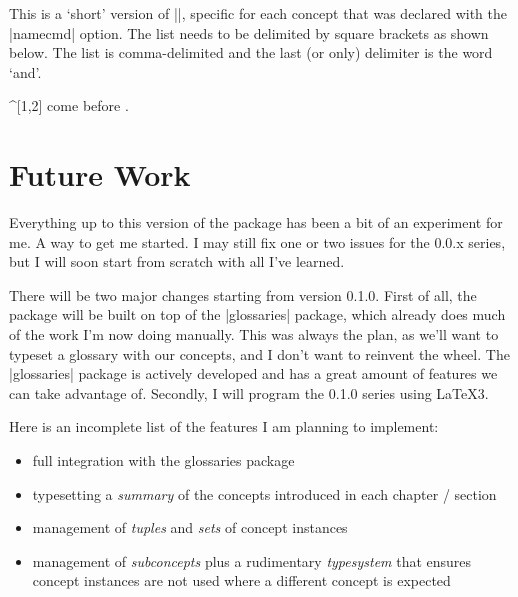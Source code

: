 \documentclass[a4paper]{packagedoc}
\begin{document}
This is a `short' version of |\ConceptNameAndSymbols|,
specific for each concept that was declared with the |namecmd| option.
The  list needs to be delimited by square brackets
as shown below. The list is comma-delimited and the last (or only) delimiter is
the word `and'.

\begin{latex-example-show}
\delta^[1,2] come before \delta[3]. 
\end{latex-example-show}

\section{Future Work}                                                          %

Everything up to this version of the package has been a bit of an experiment
for me. A way to get me started. I may still fix one or two issues for the
0.0.x series, but I will soon start from scratch with all I've learned.

There will be two major changes starting from version 0.1.0. First of all, the
package will be built on top of the |glossaries| package, which already does
much of the work I'm now doing manually. This was always the plan, as we'll
want to typeset a glossary with our concepts, and I don't want to reinvent
the wheel. The |glossaries| package is actively developed and has a great
amount of features we can take advantage of. Secondly, I will program the
0.1.0 series using \LaTeX3.

Here is an incomplete list of the features I am planning to implement:
\begin{itemize}
  \item full integration with the \textsf{glossaries} package
  \item typesetting a \emph{summary} of the concepts introduced in each chapter / section
  \item management of \emph{tuples} and \emph{sets} of concept instances
  \item management of \emph{subconcepts} plus a rudimentary \emph{typesystem} that
        ensures concept instances are not used where a different concept is expected
\end{itemize}

\end{document}
